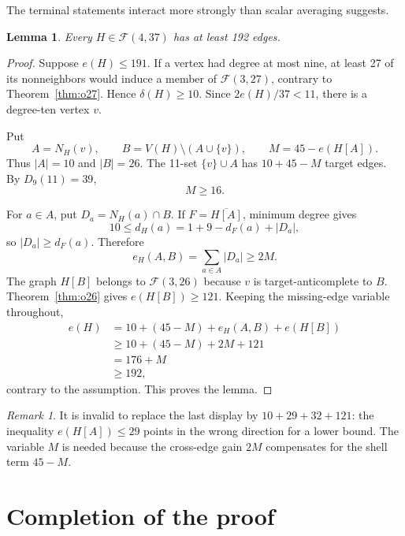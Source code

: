 \documentclass[11pt,reqno,a4paper]{amsart}
\newtheorem{lemma}[theorem]{Lemma}
\theoremstyle{definition}
\theoremstyle{remark}
\newtheorem{remark}[theorem]{Remark}
\newcommand{\comp}[1]{\overline{#1}}
\newcommand{\cF}{\mathcal F}
\begin{document}
The terminal statements interact more strongly than scalar averaging
suggests.

\begin{lemma}\label{lem:bridge}
Every $H\in\cF(4,37)$ has at least 192 edges.
\end{lemma}

\begin{proof}
Suppose $e(H)\le191$. If a vertex had degree at most nine, at least 27
of its nonneighbors would induce a member of $\cF(3,27)$, contrary to
Theorem~\ref{thm:o27}. Hence $\delta(H)\ge10$. Since
$2e(H)/37<11$, there is a degree-ten vertex $v$.

Put
\[
 A=N_H(v),\qquad
 B=V(H)\setminus(A\cup\{v\}),\qquad
 M=45-e(H[A]).
\]
Thus $|A|=10$ and $|B|=26$. The 11-set
$\{v\}\cup A$ has $10+45-M$ target edges. By
$D_9(11)=39$,
\begin{equation}\label{eq:M-lower}
 M\ge16.
\end{equation}

For $a\in A$, put $D_a=N_H(a)\cap B$. If
$F=\comp{H[A]}$, minimum degree gives
\[
 10\le d_H(a)=1+9-d_F(a)+|D_a|,
\]
so $|D_a|\ge d_F(a)$. Therefore
\begin{equation}\label{eq:cross-M}
 e_H(A,B)=\sum_{a\in A}|D_a|\ge2M.
\end{equation}
The graph $H[B]$ belongs to $\cF(3,26)$ because $v$ is target-anticomplete
to $B$. Theorem~\ref{thm:o26} gives $e(H[B])\ge121$. Keeping the
missing-edge variable throughout,
\[
\begin{aligned}
 e(H)
 &=10+(45-M)+e_H(A,B)+e(H[B])\\
 &\ge10+(45-M)+2M+121\\
 &=176+M\\
 &\ge192,
\end{aligned}
\]
contrary to the assumption. This proves the lemma.
\end{proof}

\begin{remark}
It is invalid to replace the last display by
$10+29+32+121$: the inequality $e(H[A])\le29$ points in the wrong
direction for a lower bound. The variable $M$ is needed because the
cross-edge gain $2M$ compensates for the shell term $45-M$.
\end{remark}

\section{Completion of the proof}\label{sec:final}
\end{document}
